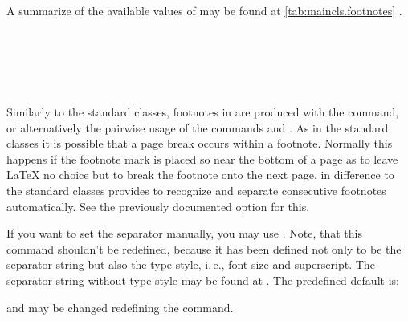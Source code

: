 A summarize of the available  values of  may
be found at \autoref{tab:maincls.footnotes}%
%
.%
%
%


\begin{Declaration}
  \\
  \\
  \\
  \\
\end{Declaration}%
%
%
%
%
%
Similarly to the standard classes, footnotes in {\KOMAScript} are produced
with the  command, or alternatively the pairwise usage of the
commands  and .  As in the standard
classes it is possible that a page break occurs within a footnote. Normally
this happens if the footnote mark is placed so near the bottom of a page as to
leave {\LaTeX} no choice but to break the footnote onto the next page.
\KOMAScript{} in difference to the standard classes
provides to recognize and separate consecutive footnotes
automatically. See the previously documented
option  for this.

If you want to set the separator manually, you may use
. Note, that this command shouldn't be
redefined, because it has been defined not only to be the separator string but
also the type style, i.\,e., font size and superscript. The separator string
without type style may be found at . The
predefined default is:
\begin{lstcode}[belowskip=\dp\strutbox]
  \newcommand*{\multfootsep}{,}
\end{lstcode}
and may be changed redefining the command.

